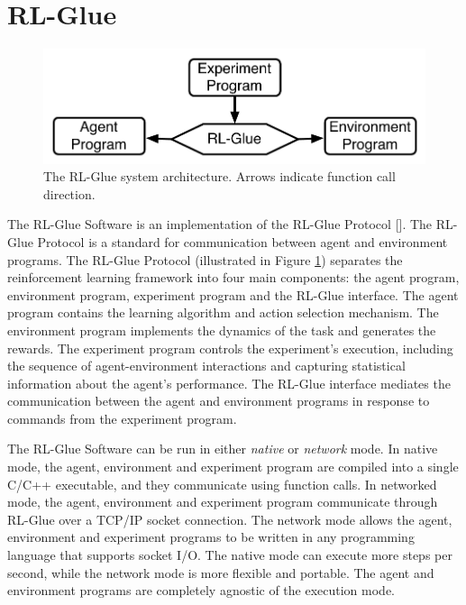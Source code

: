 \documentclass[twopage,11pt]{article}
\begin{document}
	 

\section{RL-Glue}

\begin{figure}[ht]
\begin{center}
\includegraphics[width = 9 cm]{glue.pdf}
\vspace{-0.2cm}
\caption{\small The RL-Glue system architecture. Arrows indicate function call direction.}\label{fig:RLDIA}
\end{center}
\vspace{-0.4cm}
\end{figure}

The RL-Glue Software is an implementation of the RL-Glue Protocol [\cite{whitesutton}]. The RL-Glue Protocol is a standard for communication between agent and environment programs. The RL-Glue Protocol (illustrated in Figure \ref{fig:RLDIA}) separates the reinforcement learning framework into four main components: the agent program, environment program, experiment program and the RL-Glue interface. The agent program contains the learning algorithm and action selection mechanism. The environment program implements the dynamics of the task and generates the rewards. The experiment program controls the experiment's execution, including the sequence of agent-environment interactions and capturing statistical information about the agent's performance.  The RL-Glue interface mediates the communication between the agent and environment programs in response to commands from the experiment program. 

The RL-Glue Software can be run in either {\it native} or {\it network} mode. In native mode, the agent, environment and experiment program are compiled into a single C/C++ executable, and they communicate using function calls.  In networked mode, the agent, environment and experiment program communicate through RL-Glue over a TCP/IP socket connection. The network mode allows the agent, environment and experiment programs to be written in any programming language that supports socket I/O. The native mode can execute more steps per second, while the network mode is more flexible and portable. The agent and environment programs are completely agnostic of the execution mode.       
\end{document}
